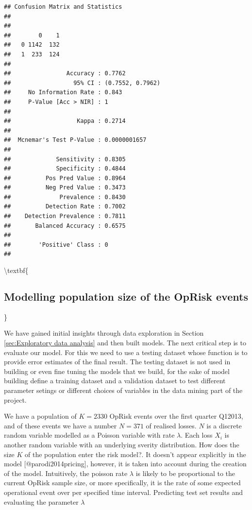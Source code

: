\documentclass[]{article}
\begin{document}
\begin{verbatim}
## Confusion Matrix and Statistics
## 
##    
##        0    1
##   0 1142  132
##   1  233  124
##                                           
##                Accuracy : 0.7762          
##                  95% CI : (0.7552, 0.7962)
##     No Information Rate : 0.843           
##     P-Value [Acc > NIR] : 1               
##                                           
##                   Kappa : 0.2714          
##                                           
##  Mcnemar's Test P-Value : 0.0000001657    
##                                           
##             Sensitivity : 0.8305          
##             Specificity : 0.4844          
##          Pos Pred Value : 0.8964          
##          Neg Pred Value : 0.3473          
##              Prevalence : 0.8430          
##          Detection Rate : 0.7002          
##    Detection Prevalence : 0.7811          
##       Balanced Accuracy : 0.6575          
##                                           
##        'Positive' Class : 0               
## 
\end{verbatim}

\textbackslash{}textbf\{

\subsection{Modelling population size of the OpRisk events}

\}

We have gained initial insights through data exploration in Section
\ref{sec:Exploratory data analysis} and then built models. The next
critical step is to evaluate our model. For this we need to use a
testing dataset whose function is to provide error estimates of the
final result. The testing dataset is not used in building or even fine
tuning the models that we build, for the sake of model building define a
training dataset and a validation dataset to test different parameter
setings or different choices of variables in the data mining part of the
project.\medskip

We have a population of \(K = 2330\) OpRisk events over the first
quarter Q12013, and of these events we have a number \(N = 371\) of
realised losses. \(N\) is a discrete random variable modelled as a
Poisson variable with rate \(\lambda\). Each loss \(X_i\) is another
random variable with an underlying sverity distribution. How does the
size \(K\) of the population enter the risk model?. It doesn't appear
explicitly in the model {[}@parodi2014pricing{]}, however, it is taken
into account during the creation of the model. Intuitively, the poisson
rate \(\lambda\) is likely to be proportional to the current OpRisk
sample size, or more specifically, it is the rate of some expected
operational event over per specified time interval. Predicting test set
results and evaluating the parameter \(\lambda\)
\end{document}
